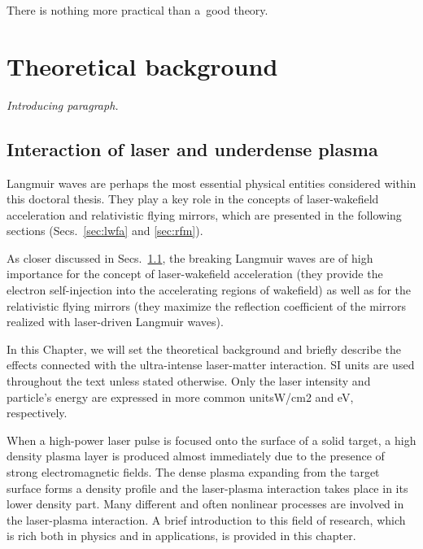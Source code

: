 \documentclass[10pt, a4paper, twoside, openright]{report}
\begin{document}

\begin{savequote}[0.45\linewidth]
	\begin{fquote}
		 There is nothing more practical than a~good theory.
	\end{fquote}
\end{savequote}

\chapter{Theoretical background\label{chap:theoretical_background}}

\noindent \textsl{Introducing paragraph.}

\section{Interaction of laser and underdense plasma}

Langmuir waves are perhaps the most essential physical entities considered within this doctoral thesis. They play a key role in the concepts of laser-wakefield acceleration and relativistic flying mirrors, which are presented in the following sections (Secs.~\ref{sec:lwfa} and \ref{sec:rfm}). 

As closer discussed in Secs.~\ref{}, the breaking Langmuir waves are of high importance for the concept of laser-wakefield acceleration (they provide the electron self-injection into the accelerating regions of wakefield) as well as for the relativistic flying mirrors (they maximize the reflection coefficient of the mirrors realized with laser-driven Langmuir waves). 

In this Chapter, we will set the theoretical background and briefly describe the effects
connected with the ultra-intense laser-matter interaction. SI units are used throughout the
text unless stated otherwise. Only the laser intensity and particle’s energy are expressed in
more common unitsW/cm2 and eV, respectively.


When a high-power laser pulse is focused onto the surface of a solid target, a high density plasma layer is produced almost immediately due to the presence of strong electromagnetic fields. The dense plasma expanding from the target surface forms a density profile and the laser-plasma interaction takes place in its lower density part. Many different and often nonlinear processes are involved in the laser-plasma interaction. A brief introduction to this field of research, which is rich both in physics and in applications, is provided in this chapter.
\end{document}
